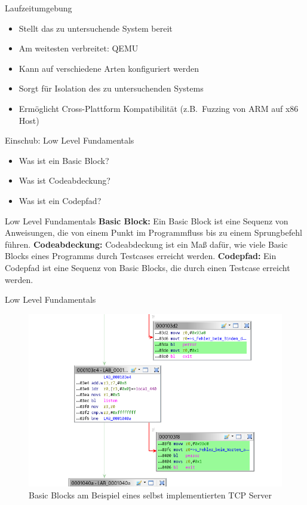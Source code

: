 \begin{frame}{Laufzeitumgebung}
    \begin{itemize}
        \item Stellt das zu untersuchende System bereit
        \item Am weitesten verbreitet: QEMU
        \item Kann auf verschiedene Arten konfiguriert werden
        \item Sorgt für Isolation des zu untersuchenden Systems
        \item Ermöglicht Cross-Plattform Kompatibilität (z.B.\ Fuzzing von ARM auf x86 Host)
    \end{itemize}
\end{frame}
\begin{frame}{Einschub: Low Level Fundamentals}
    \begin{itemize}
        \item Was ist ein Basic Block?
        \item Was ist Codeabdeckung?
        \item Was ist ein Codepfad?
    \end{itemize}
\end{frame}
\begin{frame}{Low Level Fundamentals}
    \textbf{Basic Block:} Ein Basic Block ist eine Sequenz von Anweisungen, die von einem Punkt im Programmfluss bis zu einem Sprungbefehl führen.\break
    \textbf{Codeabdeckung:} Codeabdeckung ist ein Maß dafür, wie viele Basic Blocks eines Programms durch Testcases erreicht werden.\break
    \textbf{Codepfad:} Ein Codepfad ist eine Sequenz von Basic Blocks, die durch einen Testcase erreicht werden.
\end{frame}
\begin{frame}{Low Level Fundamentals}
    \begin{figure}[H]
        \centering
        \includegraphics[width=\textwidth]{res/basic_block_example}
        \caption[Basic Blocks am Beispiel eines selbst implementierten TCP Server]{Basic Blocks am Beispiel eines selbst implementierten TCP Server}
        \label{fig:basic-blocks}
    \end{figure}
\end{frame}
